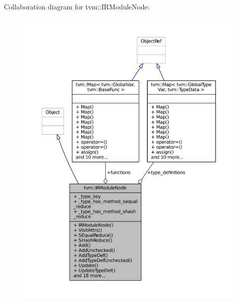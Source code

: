 Collaboration diagram for tvm\+:\+:I\+R\+Module\+Node\+:
\nopagebreak
\begin{figure}[H]
\begin{center}
\leavevmode
\includegraphics[width=350pt]{classtvm_1_1IRModuleNode__coll__graph}
\end{center}
\end{figure}
